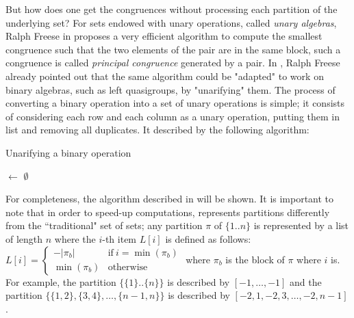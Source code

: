 \documentclass{mcom-l}
\begin{document}
 
 \noindent But how does one get the congruences without processing each partition of the underlying set? For sets endowed with unary operations, called \emph{unary algebras}, Ralph Freese in \cite{freese2008computing} proposes a very efficient algorithm to compute the smallest congruence such that the two elements of the pair are in the same block, such a congruence is called \emph{principal congruence} generated by a pair. In \cite{freese2008computing}, Ralph Freese already pointed out that the same algorithm could be "adapted" to work on binary algebras, such as left quasigroups, by "unarifying" them. \newline
 The process of converting a binary operation into a set of unary operations is simple; it consists of considering each row and each column as a unary operation, putting them in list and removing all duplicates. It described by the following algorithm:
 
 \begin{algorithm}[H]
\label{unarify}
\DontPrintSemicolon
\caption{Unarifying a binary operation}

\BlankLine
\BlankLine
\unary $\leftarrow$ $\emptyset$\;
\Return{\unary}
\end{algorithm}
\noindent For completeness, the algorithm described in \cite{freese2008computing} will be shown. It is important to note that in order to speed-up computations, \cite{freese2008computing} represents partitions differently from the ``traditional" set of sets; any partition $\pi$ of $\{1..n\}$ is represented by a list of length $n$ where the $i$-th item $L[i]$ is defined as follows:\newline 
$L[i] = \begin{cases} 
      -|\pi_b| & \text{if}~i=\min{(\pi_b)}\\
      \min{(\pi_b)} & \text{otherwise}
   \end{cases}$ where $\pi_b$ is the block of $\pi$ where $i$ is. 
\noindent For example, the partition $\{\{1\}..\{n\}\}$ is described by $[-1,\dots,-1]$ and the partition $\{\{1,2\}, \{3,4\},\dots,\{n-1, n\}\}$ is described by $[-2,1,-2,3,\dots, -2, n-1]$.\newline
\end{document}
